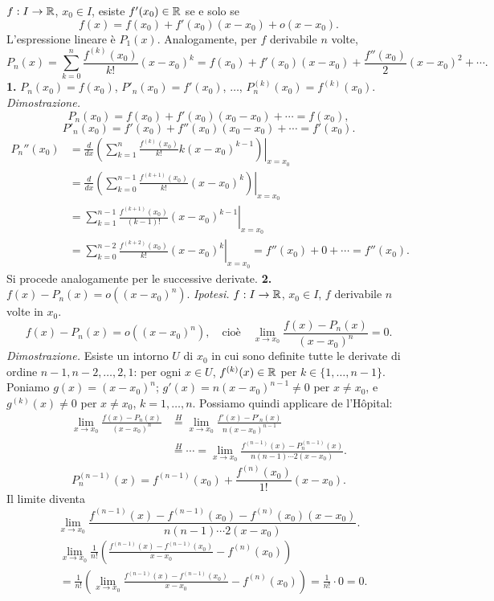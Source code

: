 $f:I\to\mathbb R$, $x_0\in I$, esiste $f'(x_0)\in\mathbb R$ se e solo se
\[f(x)=f(x_0)+f'(x_0)(x-x_0)+o(x-x_0).\]
L'espressione lineare è $P_1(x)$. Analogamente, per $f$ derivabile $n$ volte,
\[P_n(x)=\sum_{k=0}^n\frac{f^{(k)}(x_0)}{k!}(x-x_0)^k
=f(x_0)+f'(x_0)(x-x_0)+\frac{f''(x_0)}2(x-x_0)^2+\cdots.\]
\textbf{1.} $P_n(x_0)=f(x_0)$, $P'_n(x_0)=f'(x_0)$, $\ldots$, $P_n^{(k)}(x_0)=f^{(k)}(x_0)$.
\textit{Dimostrazione.}
\[P_n(x_0)=f(x_0)+f'(x_0)(x_0-x_0)+\cdots=f(x_0),\]
\[P'_n(x_0)=f'(x_0)+f''(x_0)(x_0-x_0)+\cdots=f'(x_0).\]
\begin{align*}
P_n''(x_0)&=\left.\frac d{dx}\left(\sum_{k=1}^n\frac{f^{(k)}(x_0)}{k!}k(x-x_0)^{k-1}\right)\right|_{x=x_0}\\
&=\left.\frac d{dx}\left(\sum_{k=0}^{n-1}\frac{f^{(k+1)}(x_0)}{k!}(x-x_0)^k\right)\right|_{x=x_0}\\
&=\left.\sum_{k=1}^{n-1}\frac{f^{(k+1)}(x_0)}{(k-1)!}(x-x_0)^{k-1}\right|_{x=x_0}\\
&=\left.\sum_{k=0}^{n-2}\frac{f^{(k+2)}(x_0)}{k!}(x-x_0)^k\right|_{x=x_0}=f''(x_0)+0+\cdots=f''(x_0).
\end{align*}
Si procede analogamente per le successive derivate.
\textbf{2.} $f(x)-P_n(x)=o((x-x_0)^n)$.
\textit{Ipotesi.} $f:I\to\mathbb R$, $x_0\in I$, $f$ derivabile $n$ volte in $x_0$.
\[f(x)-P_n(x)=o((x-x_0)^n),\quad\text{cioè}\quad\lim_{x\to x_0}\frac{f(x)-P_n(x)}{(x-x_0)^n}=0.\]
\textit{Dimostrazione.} Esiste un intorno $U$ di $x_0$ in cui sono definite tutte le derivate di ordine $n-1,n-2,\ldots,2,1$: per ogni $x\in U$, $f^{(k)}(x)\in\mathbb R$ per $k\in\{1,\ldots,n-1\}$.
Poniamo $g(x)=(x-x_0)^n$; $g'(x)=n(x-x_0)^{n-1}\ne0$ per $x\ne x_0$, e $g^{(k)}(x)\ne0$ per $x\ne x_0$, $k=1,\ldots,n$.
Possiamo quindi applicare de l'Hôpital:
\begin{align*}
\lim_{x\to x_0}\frac{f(x)-P_n(x)}{(x-x_0)^n}
&\overset H=\lim_{x\to x_0}\frac{f'(x)-P'_n(x)}{n(x-x_0)^{n-1}}\\
&\overset H=\cdots=\lim_{x\to x_0}\frac{f^{(n-1)}(x)-P_n^{(n-1)}(x)}{n(n-1)\cdots2(x-x_0)}.
\end{align*}
\[P_n^{(n-1)}(x)=f^{(n-1)}(x_0)+\frac{f^{(n)}(x_0)}{1!}(x-x_0).\]
Il limite diventa
\[\lim_{x\to x_0}\frac{f^{(n-1)}(x)-f^{(n-1)}(x_0)-f^{(n)}(x_0)(x-x_0)}{n(n-1)\cdots2(x-x_0)}.\]
\begin{align*}
&\lim_{x\to x_0}\frac1{n!}\left(\frac{f^{(n-1)}(x)-f^{(n-1)}(x_0)}{x-x_0}-f^{(n)}(x_0)\right)\\
&=\frac1{n!}\left(\lim_{x\to x_0}\frac{f^{(n-1)}(x)-f^{(n-1)}(x_0)}{x-x_0}-f^{(n)}(x_0)\right)=\frac1{n!}\cdot0=0.
\end{align*}
